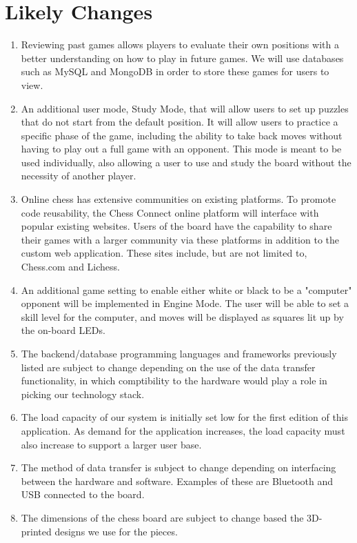\documentclass[12pt]{article}
\begin{document}
\section{Likely Changes}
\noindent
\begin{enumerate}[{LC}1., leftmargin=2\parindent]
  \item Reviewing past games allows players to evaluate their own positions with a better understanding on how to play in future games.
  We will use databases such as MySQL and MongoDB in order to store these games for users to view.
  \item An additional user mode, Study Mode, that will allow users to set up puzzles that do not start from the default position.
  It will allow users to practice a specific phase of the game, including the ability to take back moves without having to play out a full game with an opponent. 
  This mode is meant to be used individually, also allowing a user to use and study the board without the necessity of another player.
  \item Online chess has extensive communities on existing platforms. To promote code reusability, the Chess Connect online platform will interface with popular existing websites.
  Users of the board have the capability to share their games with a larger community via these platforms in addition to the custom web application. These sites include, but are not limited to, Chess.com and Lichess.
  \item An additional game setting to enable either white or black to be a "computer" opponent will be implemented in Engine Mode. The user will be able to set a skill level
  for the computer, and moves will be displayed as squares lit up by the on-board LEDs.
  \item The backend/database programming languages and frameworks previously listed
  are subject to change depending on the use of the data transfer functionality, in which comptibility to the hardware would play a role
  in picking our technology stack.  
  \item The load capacity of our system is initially set low for the
  first edition of this application. As demand for the application increases, the load capacity must also increase to support a
  larger user base.
  \item The method of data transfer is subject to change depending on
  interfacing between the hardware and software. Examples of these are Bluetooth and USB connected to the board.
  \item The dimensions of the chess board are subject to change based
  the 3D-printed designs we use for the pieces. 

  \end{enumerate}
  
\end{document}
